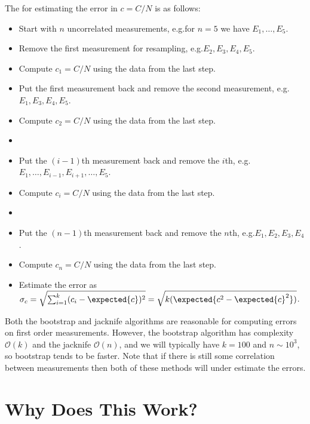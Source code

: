 \documentclass[fleqn]{NotesClass}
\newcommand*{\order}{\mathcal{O}}
\begin{document}
    The  for estimating the error in \(c = C/N\) is as follows:
    \begin{itemize}
        \item Start with \(n\) uncorrelated measurements, e.g.\@ for \(n = 5\) we have \(E_1, \dotsc, E_5\).
        \item Remove the first measurement for resampling, e.g.\@ \(E_2, E_3, E_4, E_5\).
        \item Compute \(c_1 = C/N\) using the data from the last step.
        \item Put the first measurement back and remove the second measurement, e.g.\@ \(E_1, E_3, E_4, E_5\).
        \item Compute \(c_2 = C/N\) using the data from the last step.
        \item \raisebox{-0.5ex}{\(\vdots\)}
        \item Put the \((i - 1)\)th measurement back and remove the \(i\)th, e.g.\@ \(E_1, \dotsc, E_{i-1}, E_{i+1}, \dotsc, E_5\).
        \item Compute \(c_i = C/N\) using the data from the last step.
        \item \raisebox{-0.5ex}{\(\vdots\)}
        \item Put the \((n - 1)\)th measurement back and remove the \(n\)th, e.g.\@ \(E_1, E_2, E_3, E_4\).
        \item Compute \(c_n = C/N\) using the data from the last step.
        \item Estimate the error as \(\sigma_c = \sqrt{\sum_{i=1}^k (c_i - \expected{c})^2} = \sqrt{k(\expected{c^2 - \expected{c}^2})}\).
    \end{itemize}
    
    Both the bootstrap and jacknife algorithms are reasonable for computing errors on first order measurements.
    However, the bootstrap algorithm has complexity \(\order(k)\) and the jacknife \(\order(n)\), and we will typically have \(k = 100\) and \(n \sim 10^3\), so bootstrap tends to be faster.
    Note that if there is still some correlation between measurements then both of these methods will under estimate the errors.
    
    \chapter{Why Does This Work?}
\end{document}
